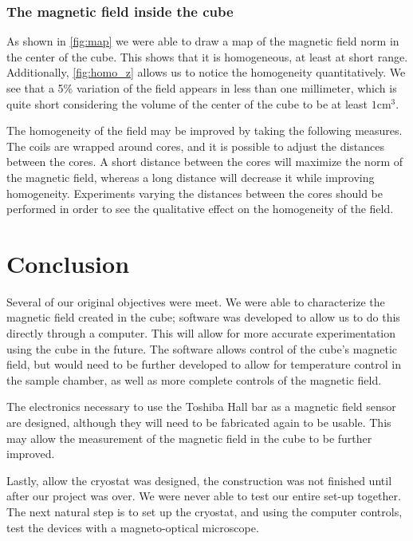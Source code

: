 \documentclass[journal,a4paper]{IEEEtran}
\begin{document}
\subsubsection{The magnetic field inside the cube}

As shown in \figurename \ref{fig:map} we were able to draw a map of the magnetic field norm in the center of the cube. This shows that it is homogeneous, at least at short range. Additionally, \figurename \ref{fig:homo_z} allows us to notice the homogeneity quantitatively. We see that a 5\% variation of the field appears in less than one millimeter, which is quite short considering the volume of the center of the cube to be at least $1\mathrm{cm^3}$.

The homogeneity of the field may be improved by taking the following measures. The coils are wrapped around cores, and it is possible to adjust the distances between the cores. A short distance between the cores will maximize the norm of the magnetic field, whereas a long distance will decrease it while improving homogeneity. Experiments varying the distances between the cores should be performed in order to see the qualitative effect on the homogeneity of the field. 

\section{Conclusion}

Several of our original objectives were meet. We were able to characterize the magnetic field created in the cube; software was developed to allow us to do this directly through a computer. This will allow for more accurate experimentation using the cube in the future. The software allows control of the cube's magnetic field, but would need to be further developed to allow for temperature control in the sample chamber, as well as more complete controls of the magnetic field.

The electronics necessary to use the Toshiba Hall bar as a magnetic field sensor are designed, although they will need to be fabricated again to be usable. This may allow the measurement of the magnetic field in the cube to be further improved.

Lastly, allow the cryostat was designed, the construction was not finished until after our project was over. We were never able to test our entire set-up together. The next natural step is to set up the cryostat, and using the computer controls, test the devices with a magneto-optical microscope.
\end{document}
